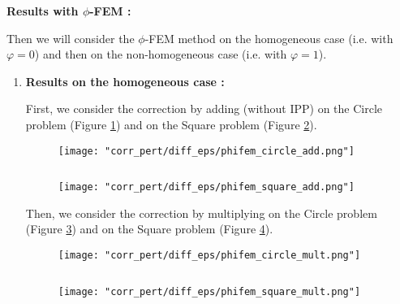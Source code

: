 \textbf{Results with $\phi$-FEM :}

Then we will consider the $\phi$-FEM method on the homogeneous case (i.e. with $\varphi=0$) and then on the non-homogeneous case (i.e. with $\varphi=1$).

\begin{enumerate}[label=\textbullet]
	\item \textbf{Results on the homogeneous case :}
	
	First, we consider the correction by adding (without IPP) on the Circle problem (Figure \ref{corr_pert_phifem_circle_add}) and on the Square problem (Figure \ref{corr_pert_phifem_square_add}).
	
	\begin{minipage}{0.48\linewidth}
		\begin{figure}[H]
			\centering
			\texttt{[image: "corr\_pert/diff\_eps/phifem\_circle\_add.png"]}
			\label{corr_pert_phifem_circle_add}
		\end{figure} 
	\end{minipage} $\qquad$
	\begin{minipage}{0.48\linewidth}
		\begin{figure}[H]
			\centering
			\texttt{[image: "corr\_pert/diff\_eps/phifem\_square\_add.png"]}
			\label{corr_pert_phifem_square_add}
		\end{figure} 
	\end{minipage}
	
	Then, we consider the correction by multiplying on the Circle problem (Figure \ref{corr_pert_phifem_circle_mult}) and on the Square problem (Figure \ref{corr_pert_phifem_square_mult}).
	
	\begin{minipage}{0.48\linewidth}
		\begin{figure}[H]
			\centering
			\texttt{[image: "corr\_pert/diff\_eps/phifem\_circle\_mult.png"]}
			\label{corr_pert_phifem_circle_mult}
		\end{figure} 
	\end{minipage} $\qquad$
	\begin{minipage}{0.48\linewidth}
		\begin{figure}[H]
			\centering
			\texttt{[image: "corr\_pert/diff\_eps/phifem\_square\_mult.png"]}
			\label{corr_pert_phifem_square_mult}
		\end{figure} 
	\end{minipage}
	

\end{enumerate}
